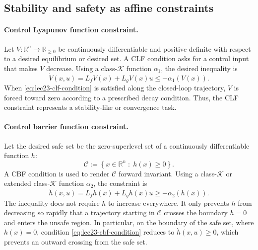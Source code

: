 \documentclass[../../master-handout.tex]{subfiles}
\begin{document}

\subsection{Stability and safety as affine constraints}

\paragraph{Control Lyapunov function constraint.}

Let $V:\mathbb{R}^{n}\rightarrow\mathbb{R}_{\geq 0}$ be continuously differentiable and positive definite with respect to a desired equilibrium or desired set. A CLF condition asks for a control input that makes $V$ decrease. Using a class-$\mathcal{K}$ function $\alpha_1$, the desired inequality is
\begin{equation}
    \dot{V}(x,u)
    =
    L_fV(x)+L_gV(x)u
    \leq
    -\alpha_1\!\left(V(x)\right).
    \label{eq:lec23-clf-condition}
\end{equation}
When \eqref{eq:lec23-clf-condition} is satisfied along the closed-loop trajectory, $V$ is forced toward zero according to a prescribed decay condition. Thus, the CLF constraint represents a stability-like or convergence task.

\paragraph{Control barrier function constraint.}

Let the desired safe set be the zero-superlevel set of a continuously differentiable function $h$:
\begin{equation}
    \mathcal{C}
    :=
    \left\{
        x\in\mathbb{R}^{n}
        \;:\;
        h(x)\geq 0
    \right\}.
    \label{eq:lec23-safe-set}
\end{equation}
A CBF condition is used to render $\mathcal{C}$ forward invariant. Using a class-$\mathcal{K}$ or extended class-$\mathcal{K}$ function $\alpha_2$, the constraint is
\begin{equation}
    \dot{h}(x,u)
    =
    L_fh(x)+L_gh(x)u
    \geq
    -\alpha_2\!\left(h(x)\right).
    \label{eq:lec23-cbf-condition}
\end{equation}
The inequality does not require $h$ to increase everywhere. It only prevents $h$ from decreasing so rapidly that a trajectory starting in $\mathcal{C}$ crosses the boundary $h=0$ and enters the unsafe region. In particular, on the boundary of the safe set, where $h(x)=0$, condition \eqref{eq:lec23-cbf-condition} reduces to $\dot{h}(x,u)\geq 0$, which prevents an outward crossing from the safe set.
\end{document}
